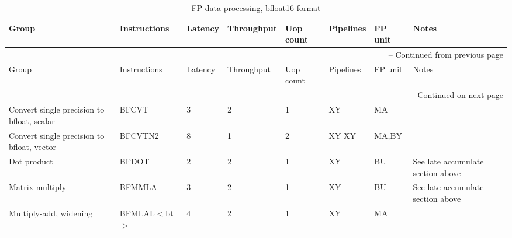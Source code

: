 \begin{longtable}{|p{1in}|p{1in}|l|l|l|p{1in}|l|p{1in}|}
\caption{FP data processing, bfloat16 format} \\
\hline
Group & Instructions & Latency & Throughput & Uop count & Pipelines & FP unit & Notes\\
\hline
\endfirsthead
\hline
\multicolumn{8}{|r|}{{\tablename\ \thetable{} -- Continued from previous page}} \\
\hline
Group & Instructions & Latency & Throughput & Uop count & Pipelines & FP unit & Notes\\
\hline
\endhead
\hline
\multicolumn{8}{|r|}{{Continued on next page}} \\
\hline
\endfoot
\hline
\endlastfoot
Convert single precision to bfloat, scalar & BFCVT & 3 & 2 & 1 & XY & MA & \\
\hline
Convert single precision to bfloat, vector & BFCVTN{{2}} & 8 & 1 & 2 & XY XY & MA,BY & \\
\hline
Dot product & BFDOT & 2 & 2 & 1 & XY & BU & See late accumulate section above\\
\hline
Matrix multiply & BFMMLA & 3 & 2 & 1 & XY & BU & See late accumulate section above\\
\hline
Multiply-add, widening & BFMLAL$<$bt$>$ & 4 & 2 & 1 & XY & MA & \\
\hline
\end{longtable}
